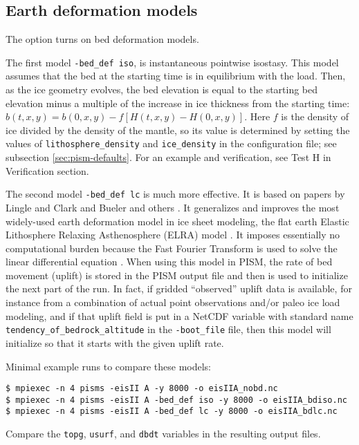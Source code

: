 \subsection{Earth deformation models} \label{subsect:beddef}  

The option  turns on bed deformation models.

The first model \verb|-bed_def iso|, is instantaneous pointwise isostasy.  This model assumes that the bed at the starting time is in equilibrium with the load.  Then, as the ice geometry evolves, the bed elevation is equal to the starting bed elevation minus a multiple of the increase in ice thickness from the starting time: $b(t,x,y) = b(0,x,y) - f [H(t,x,y) - H(0,x,y)]$.  Here $f$ is the density of ice divided by the density of the mantle, so its value is determined by setting the values of \verb|lithosphere_density| and \verb|ice_density| in the configuration file; see subsection \ref{sec:pism-defaults}.  For an example and verification, see Test H in Verification section. 

The second model \verb|-bed_def lc| is much more effective.  It is based on papers by Lingle and Clark \cite{LingleClark} and Bueler and others \cite{BLKfastearth}.  It generalizes and improves the most widely-used earth deformation model in ice sheet modeling, the flat earth Elastic Lithosphere Relaxing Asthenosphere (ELRA) model \cite{Greve2001}.  It imposes  essentially no computational burden because the Fast Fourier Transform is used to solve the linear differential equation \cite{BLKfastearth}.  When using this model in PISM, the rate of bed movement (uplift) is stored in the PISM output file and then is used to initialize the next part of the run.  In fact, if gridded ``observed'' uplift data is available, for instance from a combination of actual point observations and/or paleo ice load modeling, and if that uplift field is put in a NetCDF variable with standard name \verb|tendency_of_bedrock_altitude| in the  \texttt{-boot_file} file, then this model will initialize so that it starts with the given uplift rate.

Minimal example runs to compare these models:
\begin{verbatim}
$ mpiexec -n 4 pisms -eisII A -y 8000 -o eisIIA_nobd.nc
$ mpiexec -n 4 pisms -eisII A -bed_def iso -y 8000 -o eisIIA_bdiso.nc
$ mpiexec -n 4 pisms -eisII A -bed_def lc -y 8000 -o eisIIA_bdlc.nc
\end{verbatim}
Compare the \texttt{topg}, \texttt{usurf}, and \texttt{dbdt} variables in the resulting output files.

